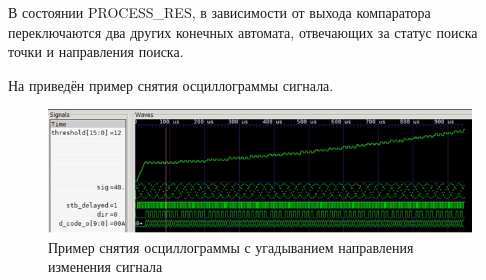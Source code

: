 В состоянии PROCESS\_RES, в зависимости от выхода компаратора переключаются два других конечных автомата, отвечающих за статус поиска точки и направления поиска.

На  приведён пример снятия осциллограммы сигнала.

\begin{figure}[ht!] 
	\center
	\includegraphics  {my_folder/images//p_find}
	\caption{Пример снятия осциллограммы с угадыванием направления изменения сигнала} 
	\label{fig:p-find}  
\end{figure}



\newpage